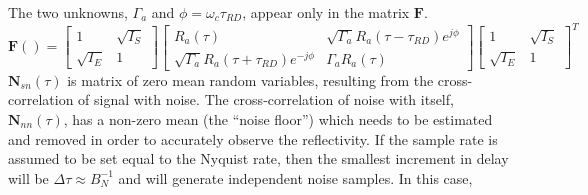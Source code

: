 \documentclass[draftcls,onecolumn]{IEEEtran}  %
\begin{document}
 The two unknowns, $\Gamma_a$ and $\phi=\omega_c \tau_{RD}$, appear only in the matrix $\mathbf{F}$. 
  \begin{equation}
 \mathbf{F}() =   \left[  \begin{array}{cc} 1  & \sqrt{I_S} \\ \sqrt{I_E} & 1  \end{array} \right]
 \left[ \begin{array}{cc} R_a(\tau) & \sqrt{\Gamma_a} R_a(\tau-\tau_{RD})  e^{j \phi }  \\ 
    \sqrt{\Gamma_a} R_a(\tau+\tau_{RD}) e^{-j \phi} & \Gamma_a R_a(\tau) \end{array} \right]
     \left[  \begin{array}{cc} 1  & \sqrt{I_S} \\ \sqrt{I_E} & 1  \end{array} \right]^T
 \label{eqn:fmat_defn}
 \end{equation}
$\mathbf{N}_{sn}(\tau)$  is matrix of zero mean random variables, resulting from the cross-correlation of signal with noise. 
The cross-correlation of noise with itself, $\mathbf{N}_{nn}(\tau)$,  has a non-zero mean (the ``noise floor'') which needs to be estimated and removed in order to accurately observe the reflectivity. 
If the sample rate is assumed to be set equal to the Nyquist rate, then the smallest increment in delay will be $\Delta \tau \approx B_N^{-1}$ and 
will generate independent noise samples. 
In this case, 
\end{document}
